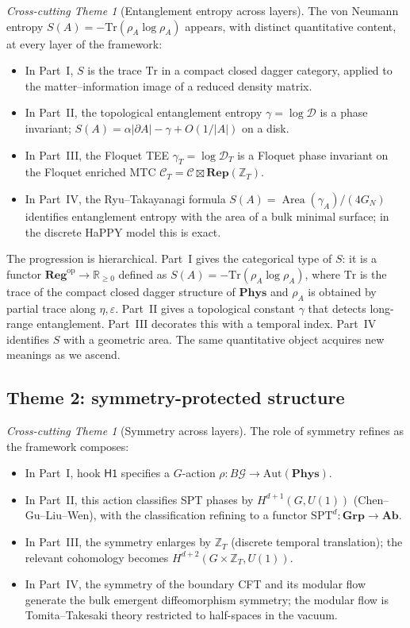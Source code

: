 \documentclass[12pt]{article}
\theoremstyle{definition}
\theoremstyle{remark}
\newtheorem{theme}[theorem]{Cross-cutting Theme}
\newcommand{\Phys}{\mathbf{Phys}}
\newcommand{\Rep}{\mathbf{Rep}}
\newcommand{\op}{\mathrm{op}}
\newcommand{\Tr}{\mathrm{Tr}}
\newcommand{\Area}{\operatorname{Area}}
\newcommand{\Z}{\mathbb{Z}}
\newcommand{\R}{\mathbb{R}}
\begin{document}
\begin{theme}[Entanglement entropy across layers]
\label{theme:EE}
The von Neumann entropy $S(A) = -\Tr(\rho_A \log \rho_A)$ appears, with
distinct quantitative content, at every layer of the framework:
\begin{itemize}[leftmargin=2em]
\item In Part~I, $S$ is the trace $\Tr$ in a compact closed dagger
  category, applied to the matter--information image of a reduced density
  matrix.
\item In Part~II, the topological entanglement entropy $\gamma = \log
  \mathcal{D}$ is a phase invariant; $S(A) = \alpha |\partial A| - \gamma +
  O(1/|A|)$ on a disk.
\item In Part~III, the Floquet TEE $\gamma_T = \log \mathcal{D}_T$ is a
  Floquet phase invariant on the Floquet enriched MTC $\mathcal{C}_T =
  \mathcal{C} \boxtimes \Rep(\Z_T)$.
\item In Part~IV, the Ryu--Takayanagi formula $S(A) = \Area(\gamma_A) /
  (4G_N)$ identifies entanglement entropy with the area of a bulk minimal
  surface; in the discrete HaPPY model this is exact.
\end{itemize}
\end{theme}

The progression is hierarchical. Part~I gives the categorical type of $S$:
it is a functor $\mathbf{Reg}^\op \to \R_{\geq 0}$ defined as
$S(A) = -\Tr(\rho_A \log \rho_A)$, where $\Tr$ is the trace of the compact
closed dagger structure of $\Phys$ and $\rho_A$ is obtained by partial trace
along $\eta, \varepsilon$. Part~II gives a topological constant $\gamma$
that detects long-range entanglement. Part~III decorates this with a
temporal index. Part~IV identifies $S$ with a geometric area. The same
quantitative object acquires new meanings as we ascend.

\subsection{Theme 2: symmetry-protected structure}
\label{sec:theme-SPT}

\begin{theme}[Symmetry across layers]
\label{theme:SPT}
The role of symmetry refines as the framework composes:
\begin{itemize}[leftmargin=2em]
\item In Part~I, hook $\mathsf{H1}$ specifies a $G$-action $\rho :
  B\mathcal{G} \to \mathrm{Aut}(\Phys)$.
\item In Part~II, this action classifies SPT phases by $H^{d+1}(G, U(1))$
  (Chen--Gu--Liu--Wen), with the classification refining to a functor
  $\mathrm{SPT}^d : \mathbf{Grp} \to \mathbf{Ab}$.
\item In Part~III, the symmetry enlarges by $\Z_T$ (discrete temporal
  translation); the relevant cohomology becomes $H^{d+2}(G \times \Z_T,
  U(1))$.
\item In Part~IV, the symmetry of the boundary CFT and its modular flow
  generate the bulk emergent diffeomorphism symmetry; the modular flow is
  Tomita--Takesaki theory restricted to half-spaces in the vacuum.
\end{itemize}
\end{theme}
\end{document}
